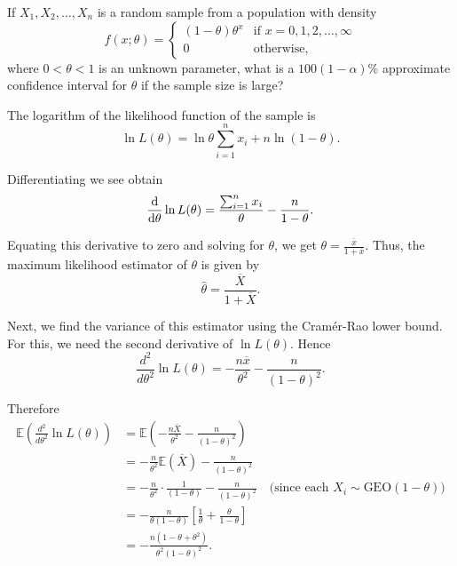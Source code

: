 \begin{example}
    If $X_1, X_2, \ldots, X_n$ is a random sample from a population with density
    \[
        f(x; \theta) = \begin{cases}
            (1 - \theta)\theta^x & \text{if } x = 0, 1, 2, \ldots, \infty\\
            0 & \text{otherwise,}
        \end{cases}
    \]
    where $0 < \theta < 1$ is an unknown parameter, what is a $100(1-\alpha)\%$ approximate confidence interval for $\theta$ if the sample size is large?
\end{example}
\begin{solution}
    The logarithm of the likelihood function of the sample is
    \[
        \ln L(\theta) = \ln \theta \sum_{i=1}^n x_i + n \ln(1 - \theta).
    \]

    Differentiating we see obtain
    \[
        \odv{}{\theta} \ln L(\theta) = \frac{\sum_{i=1}^n x_i}{\theta} - \frac{n}{1 - \theta}.
    \]

    Equating this derivative to zero and solving for $\theta$, we get $\theta = \frac{\overline{x}}{1 + \overline{x}}$. Thus, the maximum likelihood estimator of $\theta$ is given by
    \[
        \widehat{\theta} = \frac{\overline{X}}{1 + \overline{X}}.
    \]

    Next, we find the variance of this estimator using the Cramér-Rao lower bound. For this, we need the second derivative of $\ln L(\theta)$. Hence
    \[
        \frac{d^2}{d\theta^2} \ln L(\theta) = -\frac{n\overline{x}}{\theta^2} - \frac{n}{(1 - \theta)^2}.
    \]

    Therefore
    \begin{align*}
        \mathbb{E} \left( \frac{d^2}{d\theta^2} \ln L(\theta) \right)
        &= \mathbb{E} \left( -\frac{n\overline{X}}{\theta^2} - \frac{n}{(1 - \theta)^2} \right)\\
        &= -\frac{n}{\theta^2} \mathbb{E}\left(\overline{X}\right) - \frac{n}{(1 - \theta)^2}\\
        &= -\frac{n}{\theta^2} \cdot \frac{1}{(1 - \theta)} - \frac{n}{(1 - \theta)^2} \quad \text{(since each } X_i \sim \text{GEO}(1 - \theta)\text{)}\\
        &= -\frac{n}{\theta(1 - \theta)}\left[\frac{1}{\theta} + \frac{\theta}{1 - \theta}\right]\\
        &= -\frac{n(1 - \theta + \theta^2)}{\theta^2(1 - \theta)^2}.
    \end{align*}


\end{solution}
